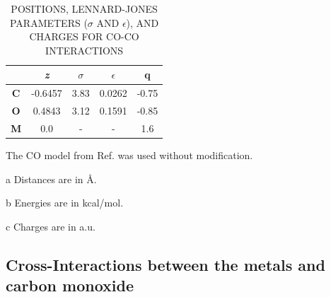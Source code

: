 \begin{table}[H]
\caption{POSITIONS, LENNARD-JONES PARAMETERS ($\sigma$ AND $\epsilon$), AND
CHARGES FOR CO-CO INTERACTIONS}
\centering
\begin{threeparttable}
\centering
\begin{tabular}{ c  c  ccc }
\hline \hline
&  {\it z}\tnote{a} & $\sigma$\tnote{a} & $\epsilon$\tnote{b} & q\tnote{c}\\
\hline
\textbf{C} & -0.6457 &  3.83 & 0.0262   &   -0.75 \\
\textbf{O} &  0.4843 &  3.12 &  0.1591  &   -0.85 \\
\textbf{M} & 0.0 & -  &  -  &    1.6 \\
\hline \hline
\end{tabular}
\begin{tablenotes}
  \item The CO model from Ref.\citep{Straub:1991no} was used without modification.
  \item[a] Distances are in \AA.
  \item[b] Energies are in kcal/mol.
  \item[c] Charges are in a.u.
\end{tablenotes}
\end{threeparttable}
\label{tab:CO}
\end{table}

\subsection{Cross-Interactions between the metals and carbon monoxide}

